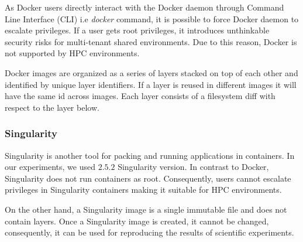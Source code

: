 \documentclass[a4paper,num-refs]{oup-contemporary}
\begin{document}

As Docker users directly interact with the
Docker daemon through Command Line Interface (CLI) i.e \textit{docker} command, it is possible to force Docker daemon to escalate privileges.
If a user gets root privileges, it
introduces unthinkable security risks for multi-tenant shared
environments. Due to this reason, Docker is not supported by
HPC environments.

Docker images are organized as a series of layers stacked on top of each
other and identified by unique layer identifiers. If a layer is reused
in different images it will
have the same id across images. Each layer consists of a filesystem diff
with respect to the layer below.

\subsubsection{Singularity}

Singularity is another tool for packing and running applications in containers. 
In our experiments, we used $2.5.2$ Singularity version. In contrast to Docker,
Singularity does not run containers as root. Consequently, users cannot escalate
privileges in Singularity containers making it suitable for HPC environments.

On the other hand, a Singularity image is a single immutable file and
does not contain layers.
Once a Singularity image is created, it cannot be changed, consequently,
it can be used for reproducing the results of scientific
experiments.
\end{document}
